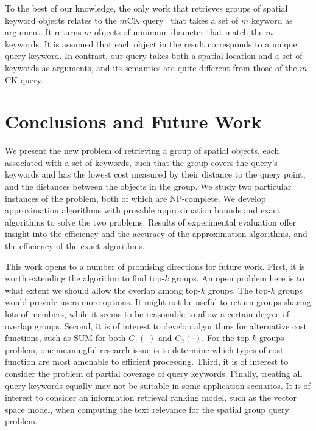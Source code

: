 \documentclass{sig-alternate}
\begin{document}
To the best of our knowledge, the only work that retrieves groups of
spatial keyword objects relates to the $m$CK
query~\cite{icde09,Zhang10} that takes a set of $m$ keyword as
argument. It returns $m$ objects of minimum diameter that match the
$m$ keywords. It is assumed that each object in the result
corresponds to a unique query keyword.
%
In contrast, our query takes both a spatial location and a set of
keywords as arguments, and its semantics are quite different from
those of the $m$CK query.

\vspace{-1ex}
\section{Conclusions and Future Work} \label{sec:conc}

We present the new problem of retrieving a group of spatial
objects, each associated with a set of keywords, such that the group
covers the query's keywords and has the lowest cost measured by
their distance to the query point, and the distances between the
objects in the group. We study two particular instances of the problem,
both of which are NP-complete. We develop approximation
algorithms with provable approximation bounds and exact algorithms
to solve the two problems.  Results of experimental evaluation
offer insight into the efficiency and the accuracy of the approximation
algorithms, and the efficiency of the exact algorithms.

This work opens to a number of promising directions for future work.
First, it is worth extending the algorithm to find top-$k$ groups.
An open problem here is to what extent we should allow the overlap
among top-$k$ groups. The top-$k$ groups would provide users more
options. It might not be useful to return groups sharing lots of
members, while it seems to be reasonable to allow a certain degree
of overlap groups.
%
Second, it is of interest to develop algorithms for alternative cost
functions, such as SUM for both $C_1(\cdot)$ and $C_2(\cdot)$.
For the top-$k$ groups problem, one meaningful research issue
is to determine which types of cost function are most amenable to efficient processing.
%
Third, it is of interest to consider the problem of partial coverage
of query keywords.
%
Finally, treating all query keywords equally may not be suitable in
some application scenarios. It is of interest to consider an
information retrieval ranking model, such as the vector space model,
when computing the text relevance for the spatial group query problem.
\end{document}
